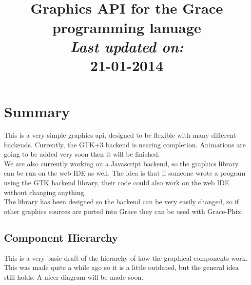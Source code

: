 \documentclass{article}
\title {
    \vspace{2in}
    \textmd{\textbf{\gphixTitle}}\\
    \normalsize\vspace{0.1in}\small{Graphics API for the Grace programming lanuage}\\
    \vspace{0.1in}\large{\textit{Last updated on:\\}}
    \vspace{0.1in}\textbf{21-01-2014}
    \vspace{3in}
}
\author{\textbf{\gphixAuthorName}}
\date{} %
\begin{document}
\grace

\maketitle



\newpage
\tableofcontents
\newpage



\section{Summary}

This is a very simple graphics api, designed to be flexible with many different backends.
Currently, the GTK+3 backend is nearing completion. Animations are going to be added very soon
then it will be finished.\\

We are also currently working on a Javascript backend, so the graphics library can be run on
the web IDE as well. The idea is that if someone wrote a program using the GTK backend library,
their code could also work on the web IDE without changing anything.\\

The library has been designed so the backend can be very easily changed, so if other graphics
sources are ported into Grace they can be used with Grace-Phix.\\


\subsection{Component Hierarchy}
This is a very basic draft of the hierarchy of how the graphical components work. This was
made quite a while ago so it is a little outdated, but the general idea still holds.
A nicer diagram will be made soon.

\vspace{0.5in}
\end{document}
